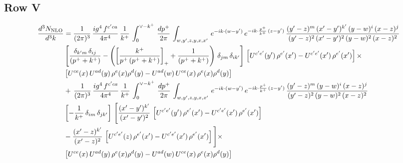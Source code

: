 \documentclass[9pt]{article}
\numberwithin{equation}{section}
\begin{document}
\subsection{Row V}
{\color{orange}\sloppy{}\par
\begin{align*}
\frac{d^{3}N_{\rm NLO}}{d^{3}k} & = \frac{1}{(2\pi)^{3}}\, \frac{ig^{4}\,f^{c'ca}}{4\pi^{4}}\, \frac{1}{k^{+}}\,\int_{0}^{\vee - k^{+}}\, \frac{dp^{+}}{2\pi}\, \int_{w,y',z,y,x,x'}\, e^{-ik\cdot (w-y')}\, e^{-ik\cdot \frac{p^{+}}{k^{+}}\,(z-y')}\,\frac{(y'-z)^{m}\,(x'-y')^{k'}\,(y-w)^{i}\,(x-z)^{j}}{(y'-z)^{2}\,(x'-y')^{2}\,(y-w)^{2}\,(x-z)^{2}}\notag \\ & \left[\frac{\delta_{k'm}\,\delta_{ij}}{(p^{+}+k^{+})}-\left(\left[\frac{k^{+}}{p^{+}\,(p^{+}+k^{+})}\right]_{+}+\frac{1}{(p^{+}+k^{+})}\right)\,\delta_{jm}\,\delta_{ik'}\right]\, \left[U^{c'e'}(y')\,\rho^{e'}(x')-U^{c'e'}(x')\,\rho^{e'}(x')\right]\times \notag \\ & \left[U^{ce}(x)\,U^{ad}(y)\,\rho^{e}(x)\rho^{d}(y)-U^{ad}(w)\,U^{ce}(x)\,\rho^{e}(x)\rho^{d}(y)\right]\notag \\&   +\,\frac{1}{(2\pi)^{3}}\, \frac{ig^{4}\,f^{c'ca}}{4\pi^{4}}\, \frac{1}{k^{+}}\,\int_{0}^{\vee - k^{+}}\, \frac{dp^{+}}{2\pi}\, \int_{w,y',z,y,x,x'}\, e^{-ik\cdot (w-y')}\, e^{-ik\cdot \frac{p^{+}}{k^{+}}\,(z-y')}\,\frac{(y'-z)^{m}\,(y-w)^{i}\,(x-z)^{j}}{(y'-z)^{2}\,(y-w)^{2}\,(x-z)^{2}}\notag \\ & \left[-\frac{1}{k^{+}}\, \delta_{im}\, \delta_{jk'}\right]\, \Bigg[\frac{(x'-y')^{k'}}{(x'-y')^{2}}\,\left[U^{c'e'}(y')\,\rho^{e'}(x')-U^{c'e'}(x')\,\rho^{e'}(x')\right]\notag \\ &-\frac{(x'-z)^{k'}}{(x'-z)^{2}}\,\left[U^{c'e'}(z)\,\rho^{e'}(x')-U^{c'e'}(x')\,\rho^{e'}(x')\right]\Bigg]\times \notag \\ &\left[U^{ce}(x)\,U^{ad}(y)\,\rho^{e}(x)\rho^{d}(y)-U^{ad}(w)\,U^{ce}(x)\,\rho^{e}(x)\rho^{d}(y)\right]
\end{align*}
}\par
\end{document}
